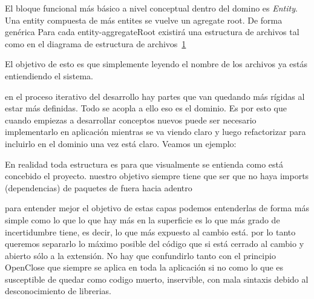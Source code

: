 

El bloque funcional más básico a nivel conceptual dentro del domino es \textit{Entity}. Una entity compuesta de más entites se vuelve un agregate root. De forma genérica Para cada entity-aggregateRoot existirá una estructura de archivos tal como en el diagrama de estructura de archivos~\cref{fig:folderEntity}

\begin{figure}[h]
    \caption{}
    \label{fig:folderEntity}
\end{figure}

El objetivo de esto es que simplemente leyendo el nombre de los archivos ya estás entiendiendo el sistema.

en el proceso iterativo del desarrollo hay partes que van quedando más rígidas al estar más definidas. Todo se acopla a ello eso es el dominio. Es por esto que cuando empiezas a desarrollar conceptos nuevos puede ser necesario implementarlo en aplicación mientras se va viendo claro y luego refactorizar para incluirlo en el dominio una vez está claro.
Veamos un ejemplo:

\begin{figure}[H]
    
    \caption{}
    \label{fig:ProjectfolderStructure}
\end{figure}

En realidad toda estructura es para que visualmente se entienda como está concebido el proyecto. nuestro objetivo siempre tiene que ser que no haya imports (dependencias) de paquetes de fuera hacia adentro


para entender mejor el objetivo de estas capas podemos entenderlas de forma más simple como lo que lo que hay más en la superficie es lo que más grado de incertidumbre tiene, es decir, lo que más expuesto al cambio está. por lo tanto queremos separarlo lo máximo posible del código que si está cerrado al cambio y abierto sólo a la extensión. No hay que confundirlo tanto con el principio OpenClose que siempre se aplica en toda la aplicación si no como lo que es susceptible de quedar como codigo muerto, inservible, con mala sintaxis debido al desconocimiento de librerias.

